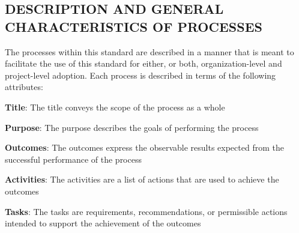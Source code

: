 	\subsection{DESCRIPTION AND GENERAL CHARACTERISTICS OF PROCESSES}
	\begin{adjustwidth}{0.5em}{0pt}

		The processes within this standard are described in a manner that is meant to facilitate the use of this standard for either, or both, organization-level and project-level adoption. Each process is described in terms of the following attributes:\\

		\begin{compactitem}

			\item {\bf Title}: The title conveys the scope of the process as a whole\\

			\item {\bf Purpose}: The purpose describes the goals of performing the process\\

			\item {\bf Outcomes}: The outcomes express the observable results expected from the successful performance of the process\\

			\item {\bf Activities}: The activities are a list of actions that are used to achieve the outcomes\\

			\item {\bf Tasks}: The tasks are requirements, recommendations, or permissible actions intended to support the achievement of the outcomes\\

		\end{compactitem}

	\end{adjustwidth}


